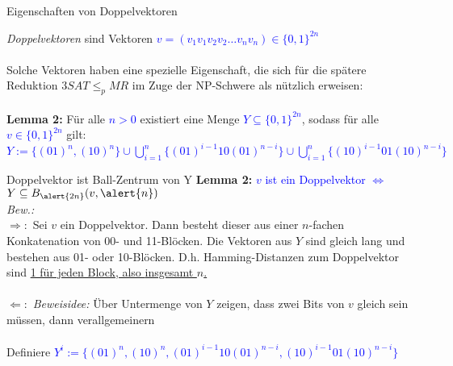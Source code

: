\documentclass[10pt, aspectratio=169]{beamer}
\begin{document}
\begin{frame}{Eigenschaften von Doppelvektoren}

\textit{Doppelvektoren} sind Vektoren \textcolor{blue}{$v=(v_1v_1v_2v_2\ldots v_nv_n) \in \{0,1\}^{2n}$}
\\~\\

Solche Vektoren haben eine spezielle Eigenschaft, die sich für die spätere Reduktion $3SAT \leq_p MR$ im Zuge der NP-Schwere als nützlich erweisen:\\~\\
\pause
\textbf{Lemma 2:} Für alle \textcolor{blue}{$n > 0$} existiert eine Menge \textcolor{blue}{$Y \subseteq \{0,1\}^{2n}$}, sodass für alle \textcolor{blue}{$v \in \{0,1\}^{2n}$} gilt: \\
\vspace{2em}
\textcolor{blue}{
    $Y := \{(01)^n, (10)^n\} \cup \bigcup_{i=1}^{n} \{(01)^{i-1}10(01)^{n-i}\}
    \cup\bigcup_{i=1}^{n} \{(10)^{i-1}01(10)^{n-i}\}$}
\end{frame}
\begin{frame}{Doppelvektor ist Ball-Zentrum von Y}
\textbf{Lemma 2: }\textcolor{blue}{$v$ ist ein Doppelvektor $\Leftrightarrow$ $Y\subseteq B_{\alert{2n}}(v,\alert{n})$}\\
\textit{Bew.:}\\

$\Rightarrow:$ Sei $v$ ein Doppelvektor. Dann besteht dieser aus einer $n$-fachen Konkatenation von 00- und 11-Blöcken. Die Vektoren aus $Y$ sind gleich lang und bestehen aus 01- oder 10-Blöcken. D.h. Hamming-Distanzen zum Doppelvektor sind \hyperlink{fakt}{\alert{1 für jeden Block}, also \alert{insgesamt $n$.} }\\~\\

$\Leftarrow:$ \textit{Beweisidee:} Über Untermenge von $Y$ zeigen, dass zwei Bits von $v$ gleich sein müssen, dann verallgemeinern\\~\\
Definiere \textcolor{blue}{$Y^i := \{(01)^n, (10)^n,(01)^{i-1}10(01)^{n-i},(10)^{i-1}01(10)^{n-i}\}$}\\~\\
\end{frame}
\end{document}
